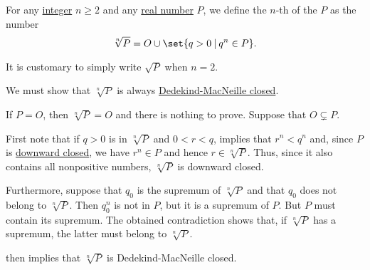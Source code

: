 \begin{definition}\label{def:nth_root}\mimprovised
  For any \hyperref[def:integers]{integer} \( n \geq 2 \) and any  \hyperref[def:real_numbers]{real number} \( P \), we define the \( n \)-th  of the \( P \) as the number
  \begin{equation*}
    \sqrt[n]{ P } = O \cup \set{ q > 0 \given q^n \in P }.
  \end{equation*}

  It is customary to simply write \( \sqrt{ P } \) when \( n = 2 \).
\end{definition}
\begin{defproof}
  We must show that \( \sqrt[n]{ P } \) is always \hyperref[def:dedekind_macnielle_closure]{Dedekind-MacNeille closed}.

  If \( P = O \), then \( \sqrt[n]{ P } = O \) and there is nothing to prove. Suppose that \( O \subsetneq P \).

  First note that if \( q > 0 \) is in \( \sqrt[n]{ P } \) and \( 0 < r < q \),  implies that \( r^n < q^n \) and, since \( P \) is \hyperref[def:closed_ordered_subset]{downward closed}, we have \( r^n \in P \) and hence \( r \in \sqrt[n]{ P } \). Thus, since it also contains all nonpositive numbers, \( \sqrt[n]{ P } \) is downward closed.

  Furthermore, suppose that \( q_0 \) is the supremum of \( \sqrt[n]{ P } \) and that \( q_0 \) does not belong to \( \sqrt[n]{ P } \). Then \( q_0^n \) is not in \( P \), but it is a supremum of \( P \). But \( P \) must contain its supremum. The obtained contradiction shows that, if \( \sqrt[n]{ P } \) has a supremum, the latter must belong to \( \sqrt[n]{ P } \).

   then implies that \( \sqrt[n]{ P } \) is Dedekind-MacNeille closed.
\end{defproof}

